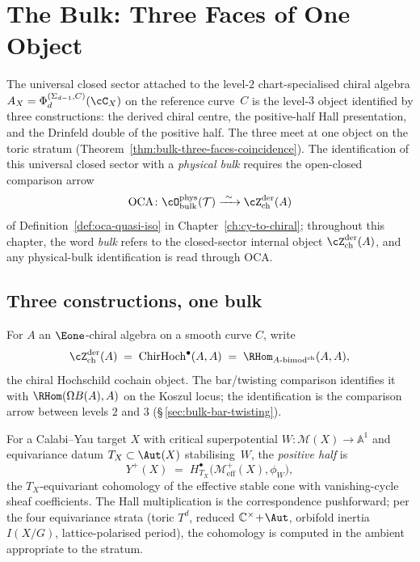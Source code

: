 \providecommand{\Yplus}{Y^{+}}%
\providecommand{\Gquant}{G}%

\chapter{The Bulk: Three Faces of One Object}
\label{ch:the-bulk-three-faces}

The universal closed sector attached to the level-$2$
chart-specialised chiral algebra
$A_X = \Phi^{(\Sigma_{d-1}, C)}_d(\cC_X)$ on the reference curve~$C$
is the level-$3$ object identified by three constructions: the derived
chiral centre, the positive-half Hall presentation, and the Drinfeld
double of the positive half. The three meet at one object on the toric
stratum (Theorem~\ref{thm:bulk-three-faces-coincidence}). The
identification of this universal closed sector with a \emph{physical
bulk} requires the open-closed comparison arrow
\[
 \mathrm{OCA} \colon
 \cO^{\mathrm{phys}}_{\mathrm{bulk}}(\mathcal T)
 \xrightarrow{\ \sim\ }
\cZ^{\mathrm{der}}_{\mathrm{ch}}(A)
\]
of Definition~\ref{def:oca-quasi-iso} in
Chapter~\ref{ch:cy-to-chiral}; throughout this chapter, the word
\emph{bulk} refers to the closed-sector internal object
$\cZ^{\mathrm{der}}_{\mathrm{ch}}(A)$, and any physical-bulk
identification is read through OCA.

\section{Three constructions, one bulk}
\label{sec:bulk-three-constructions}

\begin{definition}
\label{def:bulk-zder-ch}
For $A$ an $\Eone$-chiral algebra on a smooth curve $C$, write
\[
 \cZ^{\mathrm{der}}_{\mathrm{ch}}(A)
 \;=\; \mathrm{ChirHoch}^{\bullet}(A, A)
 \;=\; \RHom_{A\text{-bimod}^{\mathrm{ch}}}(A, A),
\]
the chiral Hochschild cochain object. The bar/twisting comparison
identifies it with $\RHom(\Omega B(A), A)$ on the Koszul locus; the
identification is the comparison arrow between levels $2$ and $3$
(\S\,\ref{sec:bulk-bar-twisting}).
\end{definition}

\begin{definition}
\label{def:bulk-yplus}
For a Calabi--Yau target $X$ with critical superpotential
$W \colon \mathcal M(X) \to \mathbb A^1$ and equivariance datum
$T_X \subset \Aut(X)$ stabilising~$W$, the \emph{positive half} is
\[
 Y^{+}(X) \;=\; H^{\bullet}_{T_X}\!\bigl(\mathcal M^{+}_{\mathrm{eff}}(X),
 \phi_{W}\bigr),
\]
the $T_X$-equivariant cohomology of the effective stable cone with
vanishing-cycle sheaf coefficients. The Hall multiplication is the
correspondence pushforward; per the four equivariance strata
(toric $T^d$, reduced $\mathbb C^{\times}\!+\!\Aut$, orbifold inertia
$I(X/G)$, lattice-polarised period), the cohomology is computed in the
ambient appropriate to the stratum.
\end{definition}

